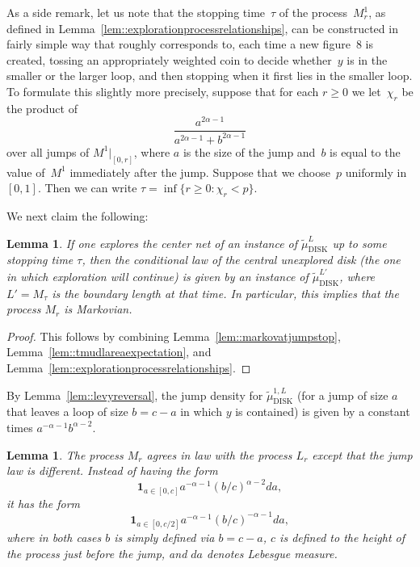 \documentclass[JEP,XML,SOM,Unicode]{cedram}
\theoremstyle{plain}
\numberwithin{theorem}{section}
\newtheorem{lemma}[theorem]{Lemma}
\theoremstyle{definition}
\newcommand{\one}{{\mathbf 1}}
\newcommand{\tmudonel}{\wt{\mu}_{ \mathrm{DISK}}^{1, L}}
\newcommand{\tmudl}{\wt{\mu}_{\mathrm{DISK}}^L}
\def\tmudlset#1{\wt{\mu}_{\mathrm{DISK}}^{#1}}
\let\wt\widetilde
\begin{document}
As a side remark, let us note that the stopping time~$\tau$ of the process~$M_r^1$, as defined in Lemma~\ref{lem::explorationprocessrelationships}, can be constructed in fairly simple way that roughly corresponds to, each time a new figure~$8$ is created, tossing an appropriately weighted coin to decide whether~$y$ is in the smaller or the larger loop, and then stopping when it first lies in the smaller loop. To formulate this slightly more precisely, suppose that for each $r \geq 0$ we let~$\chi_r$ be the product of\vspace*{-3pt}\enlargethispage{.5\baselineskip}%
\[
\frac{a^{2\alpha-1}}{a^{2\alpha-1}+b^{2\alpha-1}}
\]
over all jumps of $M^1|_{[0,r]}$, where $a$ is the size of the jump and~$b$ is equal to the value of~$M^1$ immediately after the jump. Suppose that we choose~$p$ uniformly in $[0,1]$. Then we can write $\tau = \inf\{r \geq 0 : \chi_r < p\}$.

We next claim the following:
\begin{lemma}
\label{lem::mtmarkovian}
If one explores the center net of an instance of $\tmudl$ up to some stopping time $\tau$, then the conditional law of the central unexplored disk (\ie the one in which exploration will continue) is given by an instance of $\tmudlset{L'}$, where $L' = M_\tau$ is the boundary length at that time. In particular, this implies that the process $M_r$ is Markovian.
\end{lemma}
\begin{proof}
This follows by combining Lemma~\ref{lem::markovatjumpstop}, Lemma~\ref{lem::tmudlareaexpectation}, and Lemma~\ref{lem::explorationprocessrelationships}.
\end{proof}

By Lemma~\ref{lem::levyreversal}, the jump density for $\tmudonel$ (for a jump of size $a$ that leaves a loop of size $b = c-a$ in which $y$ is contained) is given by a constant times $a^{-\alpha-1} b^{\alpha - 2}$.

\begin{lemma}
\label{lem::mtjumplaw}
The process $M_r$ agrees in law with the process $L_r$ except that the jump law is different. Instead of having the form
\begin{equation}
\label{eqn::levy_jump_law}
\one_{a \in [0,c]} a^{-\alpha-1} (b/c)^{\alpha-2} da,
\end{equation}
it has the form
\begin{equation}
\label{eqn::firstradon}
\one_{a \in [0,c/2]} a^{-\alpha - 1} (b/c)^{-\alpha-1} da,
\end{equation}
where in both cases $b$ is simply defined via $b = c-a$, $c$ is defined to the height of the process just before the jump, and $da$ denotes Lebesgue measure.
\end{lemma}
\end{document}

